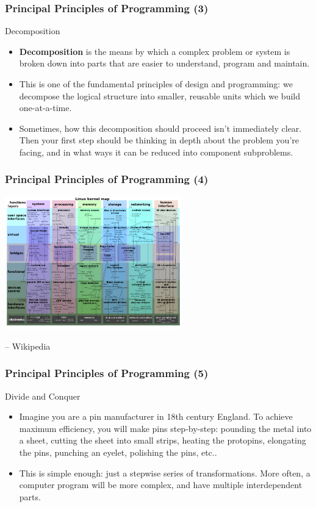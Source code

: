 \documentclass[10pt]{beamer}
\begin{document}
\begin{frame}
  \frametitle{Principal Principles of Programming (3)}
  \begin{block}{Decomposition}
    \begin{itemize}
      \item \textbf{Decomposition} is the means by which a complex problem or system is broken down into parts that are easier to understand, program and maintain.
      \item This is one of the fundamental principles of design and programming: we decompose the logical structure into smaller, reusable units which we build one-at-a-time.
      \item Sometimes, how this decomposition should proceed isn't immediately clear.
        Then your first step should be thinking in depth about the problem you're facing, and in what ways it can be reduced into component subproblems.
    \end{itemize}
  \end{block}
\end{frame}

\begin{frame}
  \frametitle{Principal Principles of Programming (4)}
  \centering
  \includegraphics[width=290px]{LinuxKernelMap.png}
  \begin{flushright} 
    \footnotesize -- Wikipedia
  \end{flushright}
\end{frame}

\begin{frame}
  \frametitle{Principal Principles of Programming (5)}
  \begin{block}{Divide and Conquer}
    \begin{itemize}
      \item Imagine you are a pin manufacturer in 18th century England.
        To achieve maximum efficiency, you will make pins step-by-step: pounding the metal into a sheet, cutting the sheet into small strips, heating the protopins, elongating the pins, punching an eyelet, polishing the pins, etc..
      \item This is simple enough: just a stepwise series of transformations.
        More often, a computer program will be more complex, and have multiple interdependent parts.
    \end{itemize}
  \end{block}
\end{frame}
\end{document}
